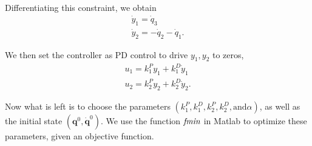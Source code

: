 Differentiating this constraint, we obtain
\begin{align}
\dot{y}_1 = \dot{q}_3  \\
\dot{y}_2 = -\dot{q}_2 - \dot{q}_1. 
\end{align}

We then set the controller as PD control to drive $y_1, y_2$ to zeros,
\begin{align}
u_1 = k_1^P y_1 + k_1^D \dot{y}_1 \\
u_2 = k_2^P y_2 + k_2^D \dot{y}_2.
\end{align}

Now what is left is to choose the parameters $(k_1^P, k_1^D, k_2^P, k_2^D, \text{and} \alpha)$, as well as the initial state $(\bm{q}^0, \dot{\bm{q}}^0)$. We use the function $\emph{fmin}$ in Matlab to optimize these parameters, given an objective function. 








